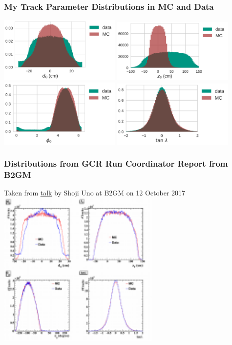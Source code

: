 \documentclass[18pt]{beamer}
\begin{document}
\begin{frame}
  \frametitle{My Track Parameter Distributions in MC and Data}
  \includegraphics[width=0.45\textwidth]{figures/gcr_august_2017_d0_distribution.pdf}
  \includegraphics[width=0.45\textwidth]{figures/gcr_august_2017_z0_distribution.pdf}\\
  \includegraphics[width=0.45\textwidth]{figures/gcr_august_2017_phi0_distribution.pdf}
  \includegraphics[width=0.45\textwidth]{figures/gcr_august_2017_tan_lambda_distribution.pdf}
\end{frame}

\begin{frame}
  \frametitle{Distributions from GCR Run Coordinator Report from B2GM}
  Taken from \href{https://kds.kek.jp/indico/event/25459/session/52/contribution/25/material/slides/0.pptx}{talk} by Shoji Uno at B2GM on 12 October 2017
  \centering
  \includegraphics[width=0.6\textwidth]{figures/trackparam_distributions_from_b2gm_grc_run_coordinator_talk_2017-10-09.pdf}
\end{frame}
\end{document}
